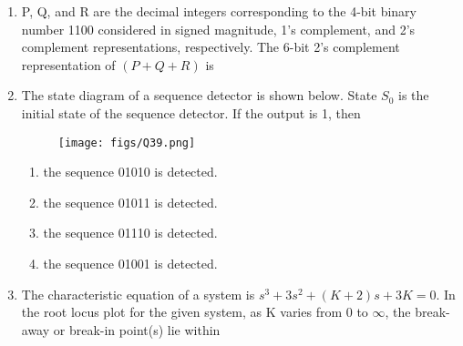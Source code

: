 \documentclass[a4paper, 11pt]{article}
\begin{document}
\begin{enumerate}
    \hfill{}

    \item P, Q, and R are the decimal integers corresponding to the 4-bit binary number 1100 considered in signed magnitude, 1's complement, and 2's complement representations, respectively. The 6-bit 2's complement representation of $(P+Q+R)$ is
    \begin{enumerate}
    \end{enumerate}

    \hfill{}

    \item The state diagram of a sequence detector is shown below. State $S_0$ is the initial state of the sequence detector. If the output is 1, then
    \begin{figure}[H]
        \centering
        \texttt{[image: figs/Q39.png]}
        \caption*{}
        \label{fig:q49}
    \end{figure}
    \begin{enumerate}
        \item the sequence 01010 is detected.
        \item the sequence 01011 is detected.
        \item the sequence 01110 is detected.
        \item the sequence 01001 is detected.
    \end{enumerate}

    \hfill{}

    \item The characteristic equation of a system is $s^3+3s^2+(K+2)s+3K=0$. In the root locus plot for the given system, as K varies from 0 to $\infty$, the break-away or break-in point(s) lie within
    \begin{enumerate}
    \end{enumerate}


\end{enumerate}
\end{document}
